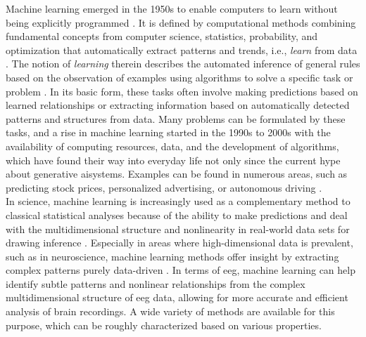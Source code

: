 Machine learning emerged in the 1950s to enable computers to learn without being explicitly programmed \cite{Samual1959}. It is defined by computational methods combining fundamental concepts from computer science, statistics, probability, and optimization that automatically extract patterns and trends, i.e., \textit{learn} from data \cite{Hastie2009}. The notion of \textit{learning} therein describes the automated inference of general rules based on the observation of examples using algorithms to solve a specific task or problem \cite{Von_luxburg2011}. In its basic form, these tasks often involve making predictions based on learned relationships or extracting information based on automatically detected patterns and structures from data. Many problems can be formulated by these tasks, and a rise in machine learning started in the 1990s to 2000s with the availability of computing resources, data, and the development of algorithms, which have found their way into everyday life not only since the current hype about generative \gls{ai}systems. Examples can be found in numerous areas, such as predicting stock prices, personalized advertising, or autonomous driving \cite{Rudin2014}.\\
In science, machine learning is increasingly used as a complementary method to classical statistical analyses because of the ability to make predictions and deal with the multidimensional structure and nonlinearity in real-world data sets for drawing inference \cite{Bzdok2018}. Especially in areas where high-dimensional data is prevalent, such as in neuroscience, machine learning methods offer insight by extracting complex patterns purely data-driven \cite{Brunton2019}. In terms of \gls{eeg}, machine learning can help identify subtle patterns and nonlinear relationships from the complex multidimensional structure of \gls{eeg} data, allowing for more accurate and efficient analysis of brain recordings. A wide variety of methods are available for this purpose, which can be roughly characterized based on various properties. 


